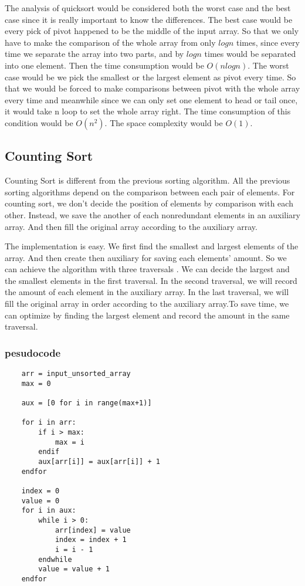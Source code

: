 \documentclass[12pt]{article}
\begin{document}
The analysis of quicksort would be considered both the worst case and the best case since it is really important to know the differences. The best case would be every pick of pivot happened to be the middle of the input array. So that we only have to make the comparison of the whole array from only $logn$ times, since every time we separate the array into two parts, and by $logn$ times would be separated into one element. Then the time consumption would be $O(nlogn)$. The worst case would be we pick the smallest or the largest element as pivot every time. So that we would be forced to make comparisons between pivot with the whole array every time and meanwhile since we can only set one element to head or tail once, it would take n loop to set the whole array right. The time consumption of this condition would be $O(n^2)$. The space complexity would be $O(1)$.

\subsection{Counting Sort}

Counting Sort is different from the previous sorting algorithm. All the previous sorting algorithms depend on the comparison between each pair of elements. For counting sort, we don't decide the position of elements by comparison with each other. Instead, we save the another of each nonredundant elements in an auxiliary array. And then fill the original array according to the auxiliary array.

The implementation is easy. We first find the smallest and largest elements of the array. And then create then auxiliary for saving each elements' amount. So we can achieve the algorithm with three traversals . We can decide the largest and the smallest elements in the first traversal. In the second traversal, we will record the amount of each element in the auxiliary array. In the last traversal, we will fill the original array in order according to the auxiliary array.To save time, we can optimize by finding the largest element and record the amount in the same traversal.

\subsubsection*{pesudocode}

\begin{verbatim}
    arr = input_unsorted_array
    max = 0

    aux = [0 for i in range(max+1)]

    for i in arr:
        if i > max:
            max = i
        endif
        aux[arr[i]] = aux[arr[i]] + 1
    endfor

    index = 0
    value = 0
    for i in aux:
        while i > 0:
            arr[index] = value
            index = index + 1
            i = i - 1
        endwhile
        value = value + 1
    endfor
\end{verbatim}
\end{document}
